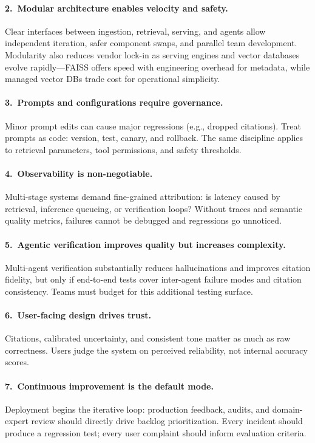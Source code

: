 \paragraph{2.\ Modular architecture enables velocity and safety.}
Clear interfaces between ingestion, retrieval, serving, and agents allow independent iteration, safer component swaps, and parallel team development. Modularity also reduces vendor lock-in as serving engines and vector databases evolve rapidly---FAISS offers speed with engineering overhead for metadata, while managed vector DBs trade cost for operational simplicity.

\paragraph{3.\ Prompts and configurations require governance.}
Minor prompt edits can cause major regressions (e.g., dropped citations). Treat prompts as code: version, test, canary, and rollback. The same discipline applies to retrieval parameters, tool permissions, and safety thresholds.

\paragraph{4.\ Observability is non-negotiable.}
Multi-stage systems demand fine-grained attribution: is latency caused by retrieval, inference queueing, or verification loops? Without traces and semantic quality metrics, failures cannot be debugged and regressions go unnoticed.

\paragraph{5.\ Agentic verification improves quality but increases complexity.}
Multi-agent verification substantially reduces hallucinations and improves citation fidelity, but only if end-to-end tests cover inter-agent failure modes and citation consistency. Teams must budget for this additional testing surface.

\paragraph{6.\ User-facing design drives trust.}
Citations, calibrated uncertainty, and consistent tone matter as much as raw correctness. Users judge the system on perceived reliability, not internal accuracy scores.

\paragraph{7.\ Continuous improvement is the default mode.}
Deployment begins the iterative loop: production feedback, audits, and domain-expert review should directly drive backlog prioritization. Every incident should produce a regression test; every user complaint should inform evaluation criteria.

